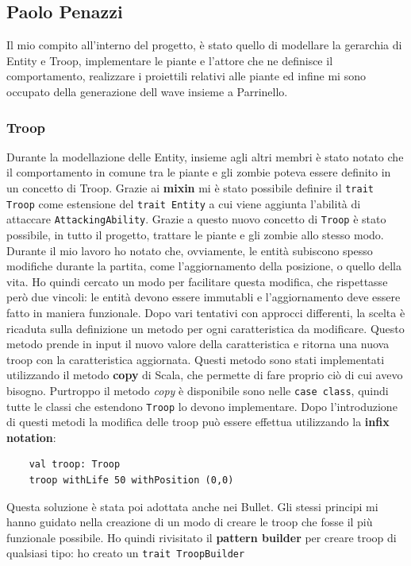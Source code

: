 \subsection{Paolo Penazzi}
Il mio compito all’interno del progetto, è stato quello di modellare la gerarchia di Entity e Troop,
implementare le piante e l'attore che ne definisce il comportamento, realizzare i proiettili relativi alle piante ed
infine mi sono occupato della generazione dell wave insieme a Parrinello.

\subsubsection{Troop}
Durante la modellazione delle Entity, insieme agli altri membri è stato notato che il comportamento in comune tra le
piante e gli zombie poteva essere definito in un concetto di Troop.
Grazie ai \textbf{mixin} mi è stato possibile definire il \texttt{trait Troop} come estensione del \texttt{trait Entity}
a cui viene aggiunta l'abilità di attaccare \texttt{AttackingAbility}.
Grazie a questo nuovo concetto di \texttt{Troop} è stato possibile, in tutto il progetto, trattare le piante e gli zombie
allo stesso modo.
Durante il mio lavoro ho notato che, ovviamente, le entità subiscono spesso modifiche durante la partita, come
l'aggiornamento della posizione, o quello della vita.
Ho quindi cercato un modo per facilitare questa modifica, che rispettasse però due vincoli: le entità devono essere
immutabli e l'aggiornamento deve essere fatto in maniera funzionale.
Dopo vari tentativi con approcci differenti, la scelta è ricaduta sulla definizione un metodo per ogni caratteristica
da modificare.
Questo metodo prende in input il nuovo valore della caratteristica e ritorna una nuova troop con la caratteristica
aggiornata.
Questi metodo sono stati implementati utilizzando il metodo \textbf{copy} di Scala, che permette di fare proprio ciò
di cui avevo bisogno.
Purtroppo il metodo \textit{copy} è disponibile sono nelle \texttt{case class}, quindi tutte le classi che estendono
\texttt{Troop} lo devono implementare.
Dopo l'introduzione di questi metodi la modifica delle troop può essere effettua utilizzando la \textbf{infix notation}:
\begin{verbatim}
    val troop: Troop
    troop withLife 50 withPosition (0,0)
\end{verbatim}
Questa soluzione è stata poi adottata anche nei Bullet.
Gli stessi principi mi hanno guidato nella creazione di un modo di creare le troop che fosse il più funzionale possibile.
Ho quindi rivisitato il \textbf{pattern builder} per creare troop di qualsiasi tipo: ho creato un \texttt{trait TroopBuilder}
